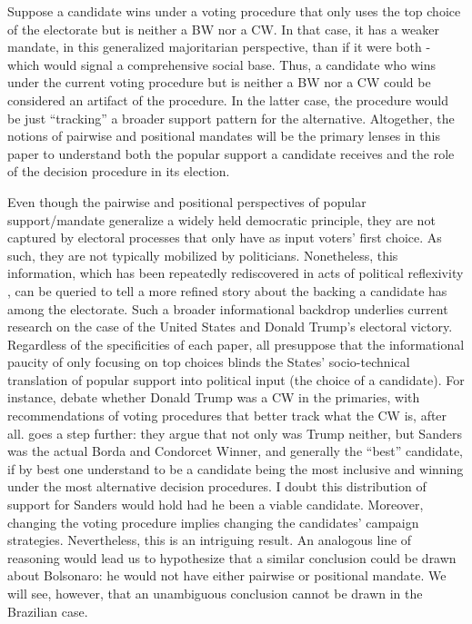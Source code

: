 \documentclass[hidelinks,11pt]{article} \usepackage[utf8]{inputenc}
\begin{document}
Suppose a candidate wins under a voting procedure that only uses the top choice
of the electorate but is neither a BW nor a CW. In that case, it has a weaker
mandate, in this generalized majoritarian perspective, than if it were both -
which would signal a comprehensive social base. Thus, a candidate who wins under
the current voting procedure but is neither a BW nor a CW could be considered an
artifact of the procedure. In the latter case, the procedure would be just
``tracking'' a broader support pattern for the alternative. Altogether, the
notions of pairwise and positional mandates will be the primary lenses in this
paper to understand both the popular support a candidate receives and the role
of the decision procedure in its election.

Even though the pairwise and positional perspectives of popular support/mandate
generalize a widely held democratic principle, they are not captured by
electoral processes that only have as input voters' first choice. As such, they
are not typically mobilized by politicians. Nonetheless, this information, which
has been repeatedly rediscovered in acts of political reflexivity
\parencite{mclean14_stran_histor_social_choic_contr}, can be queried to tell a
more refined story about the backing a candidate has among the electorate. Such
a broader informational backdrop underlies current research on the case of the
United States and Donald Trump's electoral victory. Regardless of the
specificities of each paper, all presuppose that the informational paucity of
only focusing on top choices blinds the States' socio-technical translation of
popular support into political input (the choice of a candidate). For instance,
\textcite{potthoff2021condorcet, woon2020trump, kurrild2018trump} debate whether
Donald Trump was a CW in the primaries, with recommendations of voting
procedures that better track what the CW is, after all.
\textcite{igersheim22_compar_votin_method} goes a step further: they argue that
not only was Trump neither, but Sanders was the actual Borda and Condorcet
Winner, and generally the ``best'' candidate, if by best one understand to be a
candidate being the most inclusive and winning under the most alternative
decision procedures. I doubt this distribution of support for Sanders would hold
had he been a viable candidate. Moreover, changing the voting procedure implies
changing the candidates' campaign strategies. Nevertheless, this is an
intriguing result. An analogous line of reasoning would lead us to hypothesize
that a similar conclusion could be drawn about Bolsonaro: he would not have
either pairwise or positional mandate. We will see, however, that an unambiguous
conclusion cannot be drawn in the Brazilian case.
\end{document}
